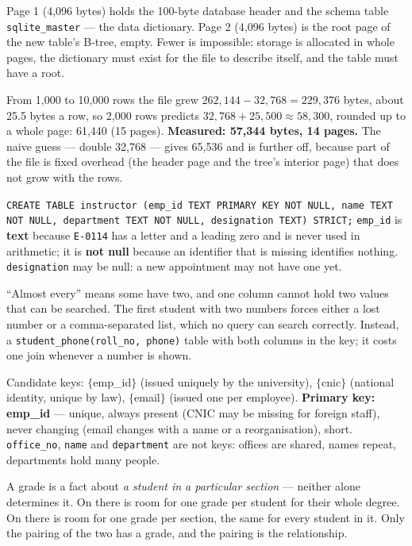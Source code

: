 \begin{ans}
  \item Page 1 (4{,}096 bytes) holds the 100-byte database header and the
        schema table \texttt{sqlite\_master} --- the data dictionary. Page 2
        (4{,}096 bytes) is the root page of the new table's B-tree, empty.
        Fewer is impossible: storage is allocated in whole pages, the
        dictionary must exist for the file to describe itself, and the table
        must have a root.
  \item From 1{,}000 to 10{,}000 rows the file grew $262{,}144 - 32{,}768 =
        229{,}376$ bytes, about 25.5 bytes a row, so 2{,}000 rows predicts
        $32{,}768 + 25{,}500 \approx 58{,}300$, rounded up to a whole page:
        61{,}440 (15 pages). \textbf{Measured: 57{,}344 bytes, 14 pages.} The
        naive guess --- double 32{,}768 --- gives 65{,}536 and is further off,
        because part of the file is fixed overhead (the header page and the
        tree's interior page) that does not grow with the rows.
  \item \texttt{CREATE TABLE instructor (emp\_id TEXT PRIMARY KEY NOT NULL,
        name TEXT NOT NULL, department TEXT NOT NULL, designation TEXT)
        STRICT;} \texttt{emp\_id} is \textbf{text} because \texttt{E-0114} has
        a letter and a leading zero and is never used in arithmetic; it is
        \textbf{not null} because an identifier that is missing identifies
        nothing. \texttt{designation} may be null: a new appointment may not
        have one yet.
\end{ans}

\begin{ans}
  \item ``Almost every'' means some have two, and one column cannot hold two
        values that can be searched. The first student with two numbers forces
        either a lost number or a comma-separated list, which no query can
        search correctly. Instead, a \texttt{student\_phone(roll\_no, phone)}
        table with both columns in the key; it costs one join whenever a
        number is shown.
  \item Candidate keys: $\{$emp\_id$\}$ (issued uniquely by the university),
        $\{$cnic$\}$ (national identity, unique by law), $\{$email$\}$ (issued
        one per employee). \textbf{Primary key: emp\_id} --- unique, always
        present (CNIC may be missing for foreign staff), never changing (email
        changes with a name or a reorganisation), short. \texttt{office\_no},
        \texttt{name} and \texttt{department} are not keys: offices are
        shared, names repeat, departments hold many people.
  \item A grade is a fact about \emph{a student in a particular section} ---
        neither alone determines it. On  there is room for one
        grade per student for their whole degree. On  there is
        room for one grade per section, the same for every student in it. Only
        the pairing of the two has a grade, and the pairing is the
        relationship.
\end{ans}

